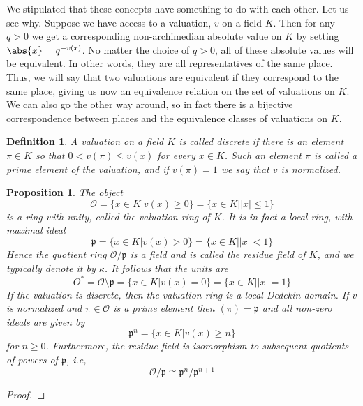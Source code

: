 \documentclass{article}
\newtheorem{definition}{Definition}[section]
\newtheorem{proposition}{Proposition}[section]
\newcommand{\mfrak}[1]{\mathfrak{#1}}
\newcommand{\mcal}[1]{\mathcal{#1}}
\begin{document}
We stipulated that these concepts have something to do with each other. Let us see why. Suppose we have access to a valuation, $v$ on a field $K$. Then for any $q > 0$ we get a corresponding  non-archimedian absolute value on $K$ by setting $\abs{x} = q^{-v(x)}$. No matter the choice of $q > 0$, all of these absolute values will be equivalent. In other words, they are all representatives of the same place. Thus, we will say that two valuations are equivalent if they correspond to the same place, giving us now an equivalence relation on the set of valuations on $K$. We can also go the other way around, so in fact there is a bijective correspondence between places and the equivalence classes of valuations on $K$.

\begin{definition}
    A valuation on a field $K$ is called discrete if there is an element $\pi \in K$ so that $0 < v(\pi) \leq v(x)$ for every $x \in K$. Such an element $\pi$ is called a prime element of the valuation, and if $v(\pi) = 1$ we say that $v$ is normalized. 
\end{definition}



\begin{proposition}
    The object
    $$\mcal O = \{x \in K |  v(x) \geq 0 \} = \{x \in K | |x| \leq 1 \}$$ 
    is a ring with unity, called the valuation ring of $K$. It is in fact a local ring, with maximal ideal 
    $$\mfrak p = \{x \in K | v(x) > 0 \} = \{x \in K | |x| < 1 \}$$
    Hence the quotient ring $\mcal O / \mfrak p$ is a field and is called the residue field of $K$, and we typically denote it by $\kappa$. It follows that the units are 
    $$O^* = \mcal O \setminus \mfrak p = \{x \in K | v(x) = 0 \} = \{x \in K | |x| = 1 \}$$
    If the valuation is discrete, then the valuation ring is a local Dedekin domain. If $v$ is normalized and $\pi \in \mcal O$ is a prime element then $(\pi) = \mfrak{p}$ and all non-zero ideals are given by
    $$\mfrak p^n = \{x \in K | v(x) \geq n \}$$
    for $n \geq 0$. Furthermore, the residue field is isomorphism to subsequent quotients of powers of $\mfrak p$, i.e,
    $$\mcal O / \mfrak p \cong \mfrak p^n / \mfrak p^{n+1}$$
\end{proposition}

\begin{proof}
    
\end{proof}
\end{document}
